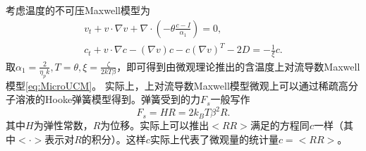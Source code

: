 	考虑温度的不可压Maxwell模型为
	\begin{eqnarray} \label{eq:Tmaxwell}
		v_t + v \cdot \nabla v + \nabla \cdot (-\theta \frac{c-I}{\alpha_1}) = 0, \\
		c_t + v \cdot \nabla c - (\nabla v) c - c (\nabla v)^T - 2 D = -\frac{1}{\xi} c.
	\end{eqnarray}
	取$\alpha_1 = \frac{2}{\eta_p k}, T = \theta,\xi = \frac{\zeta}{2 kT \beta}$，即可得到由微观理论推出的含温度上对流导数Maxwell模型\eqref{eq:MicroUCM}。	实际上，上对流导数Maxwell模型微观上可以通过稀疏高分子溶液的Hooke弹簧模型得到\cite{larson1999structure,le2009multiscale}。弹簧受到的力$F_s$一般写作
	\begin{equation*}
		F_s = H R = 2 k_B T \beta^2 R.
	\end{equation*}
	其中$H$为弹性常数，$R$为位移。实际上可以推出$<RR>$满足的方程同$c$一样（其中$<\cdot>$表示对$R$的积分）。这样$c$实际上代表了微观量的统计量$c = <RR>$。

	

